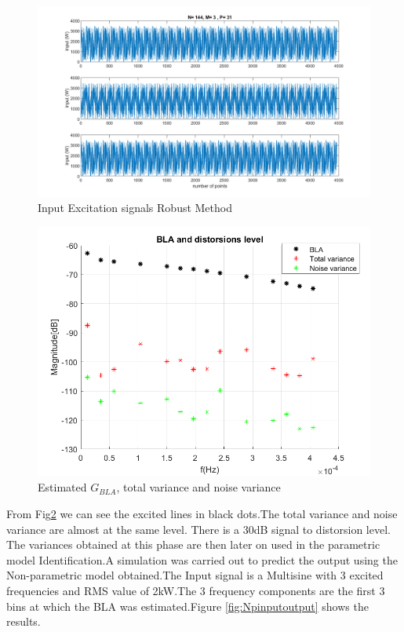 \documentclass[a4paper,12pt]{article}
\numberwithin{equation}{section}
\begin{document}
\begin{figure}[H]
    \includegraphics[width=\textwidth]{multisine.png}
    \caption{Input Excitation signals Robust Method}
    \label{fig:multisine}
\end{figure}

\begin{figure}[H]
    \includegraphics[width=\textwidth]{bla.png}
    \caption{Estimated $G_{BLA}$, total variance and noise variance}
    \label{fig:BLA}
\end{figure}

From Fig\ref{fig:BLA} we can see the excited lines in black dots.The total variance and noise variance are almost at  the same level. There is a 30dB signal to distorsion level. The variances obtained at this phase are then later on used in the parametric model Identification.A simulation was carried out to predict the output using the Non-parametric model obtained.The Input signal is a Multisine with 3 excited frequencies and RMS value of 2kW.The 3 frequency components are the first 3 bins at which the BLA was estimated.Figure \ref{fig:Npinputoutput} shows the results.
\end{document}
